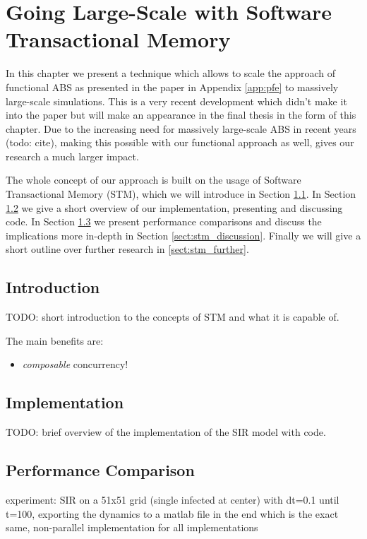 \chapter{Going Large-Scale with Software Transactional Memory}
\label{chap:stm}

In this chapter we present a technique which allows to scale the approach of functional ABS as presented in the paper in Appendix \ref{app:pfe} to massively large-scale simulations. This is a very recent development which didn't make it into the paper but will make an appearance in the final thesis in the form of this chapter. Due to the increasing need for massively large-scale ABS in recent years (todo: cite), making this possible with our functional approach as well, gives our research a much larger impact.

The whole concept of our approach is built on the usage of Software Transactional Memory (STM), which we will introduce in Section \ref{sect:stm_intro}. In Section \ref{sect:stm_impl} we give a short overview of our implementation, presenting and discussing code. In Section \ref{sect:stm_perf} we present performance comparisons and discuss the implications more in-depth in Section \ref{sect:stm_discussion}. Finally we will give a short outline over further research in \ref{sect:stm_further}.

\section{Introduction}
\label{sect:stm_intro}
TODO: short introduction to the concepts of STM and what it is capable of.

The main benefits are:
\begin{itemize}
	\item \textit{composable} concurrency!
\end{itemize}

\section{Implementation}
\label{sect:stm_impl}
TODO: brief overview of the implementation of the SIR model with code.

\section{Performance Comparison}
\label{sect:stm_perf}
experiment: SIR on a 51x51 grid (single infected at center) with dt=0.1 until t=100, exporting the dynamics to a matlab file in the end which is the exact same, non-parallel implementation for all implementations 

